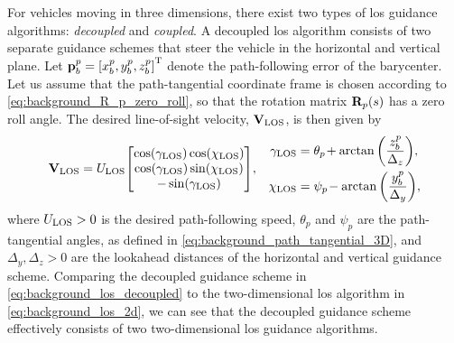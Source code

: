 For vehicles moving in three dimensions, there exist two types of \gls{los} guidance algorithms: \emph{decoupled} and \emph{coupled}.
A decoupled \gls{los} algorithm consists of two separate guidance schemes that steer the vehicle in the horizontal and vertical plane.
Let $\mathbf{p}_b^p = \left[x_b^p, y_b^p, z_b^p\right]^{\mathrm{T}}$ denote the path-following error of the barycenter.
Let us assume that the path-tangential coordinate frame is chosen according to \eqref{eq:background_R_p_zero_roll}, so that the rotation matrix $\mathbf{R}_p(s)$ has a zero roll angle.
The desired line-of-sight velocity, $\mathbf{V}_{\rm LOS}$, is then given by
\begin{align}
    \mathbf{V}_{\rm LOS} &= U_{\rm LOS} \!
    \begin{bmatrix}
        \cos(\gamma_{\rm LOS}) \cos(\chi_{\rm LOS}) \\
        \cos(\gamma_{\rm LOS}) \sin(\chi_{\rm LOS}) \\
        -\sin(\gamma_{\rm LOS})
    \end{bmatrix}\!, &
    \begin{split}
        \gamma_{\rm LOS} &= \theta_{p\!} + \arctan\left(\frac{z_b^p}{\Delta_z}\right)\!, \\
        \chi_{\rm LOS} &= \psi_{p\!} - \arctan\left(\frac{y_b^p}{\Delta_y}\right)\!, \\
    \end{split}
    \label{eq:background_los_decoupled}
\end{align}
where $U_{\rm LOS} > 0$ is the desired path-following speed, $\theta_p$ and $\psi_p$ are the path-tangential angles, as defined in \eqref{eq:background_path_tangential_3D}, and $\Delta_y, \Delta_z > 0$ are the lookahead distances of the horizontal and vertical guidance scheme.
Comparing the decoupled guidance scheme in \eqref{eq:background_los_decoupled} to the two-dimensional \gls{los} algorithm in \eqref{eq:background_los_2d}, we can see that the decoupled guidance scheme effectively consists of two two-dimensional \gls{los} guidance algorithms.


